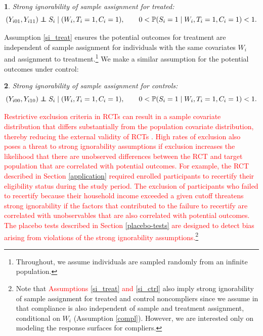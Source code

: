 \documentclass[hidelinks,12pt]{article}
\makeatletter
\newtheorem*{assumption*}{\assumptionnumber}
\providecommand{\assumptionnumber}{}
\newenvironment{assumption}[2]
 {%
  \renewcommand{\assumptionnumber}{Assumption #1}%
  \begin{assumption*}%
  \protected@edef\@currentlabel{#1}%
 }
 {%
  \end{assumption*}
 }
\newcommand{\pr}{\mathbb{P}} %
\newcommand\independent{\protect\mathpalette{\protect\independenT}{\perp}}
\def\independenT#1#2{\mathrel{\rlap{$#1#2$}\mkern2mu{#1#2}}}
\makeatother
\begin{document}
\vskip 0.2in
\begin{assumption}{3}{}\label{si_treat}
	Strong ignorability of sample assignment for treated:
	\begin{equation*}
		(Y_{i01}, Y_{i11}) \independent S_i \mid (W_i, T_i=1,C_i=1), \qquad 0 < \pr(S_i=1 \mid W_i, T_i=1,C_i=1) <1.
	\end{equation*}
\end{assumption}

\noindent Assumption \eqref{si_treat} ensures the potential outcomes for treatment are independent of sample assignment for individuals with the same covariates $W_i$ and assignment to treatment.\footnote{Throughout, we assume individuals are sampled randomly from an infinite population.} We make a similar assumption for the potential outcomes under control: 

\vskip 0.2in
\begin{assumption}{4}{}\label{si_ctrl}
	Strong ignorability of sample assignment for controls:
	\begin{equation*}
		(Y_{i00}, Y_{i10}) \independent S_i \mid (W_i, T_i=1,C_i= 1), \qquad 0 < \pr(S_i=1 \mid W_i, T_i=1,C_i=1) <1. 
\end{equation*}\end{assumption}

\textcolor{red}{Restrictive exclusion criteria in RCTs can result in a sample covariate distribution that differs substantially from the population covariate distribution, thereby reducing the external validity of RCTs \citep{rothwell2005external}. High rates of exclusion also poses a threat to strong ignorability assumptions if exclusion increases the likelihood that there are unobserved differences between the RCT and target population that are correlated with potential outcomes. For example, the RCT described in Section \ref{application} required enrolled participants to recertify their eligibility status during the study period. The exclusion of participants who failed to recertify because their household income exceeded a given cutoff threatens strong ignorability if the factors that contributed to the failure to recertify are correlated with unobservables that are also correlated with potential outcomes. The placebo tests described in Section \ref{placebo-tests} are designed to detect bias arising from violations of the strong ignorability assumptions.}\footnote{Note that \textcolor{red}{Assumptions \eqref{si_treat} and \eqref{si_ctrl}} also imply strong ignorability of sample assignment for treated and control noncompliers since we assume in that compliance is also independent of sample and treatment assignment, conditional on $W_i$ (Assumption \eqref{compl}). However, we are interested only on modeling the response surfaces for compliers.}
\end{document}
